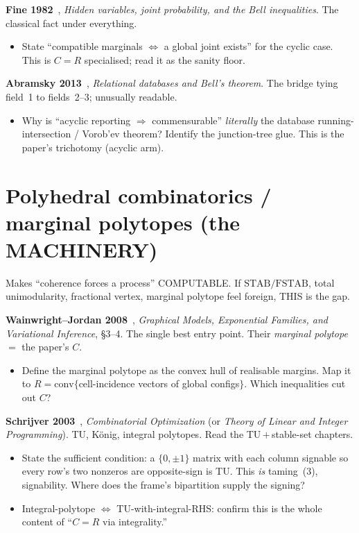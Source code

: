 \textbf{Fine 1982}~\cite{Fine1982}, \emph{Hidden variables, joint probability, and
the Bell inequalities}. The classical fact under everything.
\begin{itemize}[itemsep=1pt]
  \item State ``compatible marginals $\Leftrightarrow$ a global joint exists'' for
    the cyclic case. This is $C=R$ specialised; read it as the sanity floor.
\end{itemize}

\textbf{Abramsky 2013}~\cite{Abramsky2013}, \emph{Relational databases and Bell's
theorem}. The bridge tying field~1 to fields~2--3; unusually readable.
\begin{itemize}[itemsep=1pt]
  \item Why is ``acyclic reporting $\Rightarrow$ commensurable'' \emph{literally}
    the database running-intersection / Vorob'ev theorem? Identify the junction-tree
    glue. This is the paper's trichotomy (acyclic arm).
\end{itemize}

\section{Polyhedral combinatorics / marginal polytopes (the MACHINERY)}

Makes ``coherence forces a process'' COMPUTABLE. If $\mathrm{STAB}/\mathrm{FSTAB}$,
total unimodularity, fractional vertex, marginal polytope feel foreign, THIS is the
gap.

\textbf{Wainwright--Jordan 2008}~\cite{WainwrightJordan2008}, \emph{Graphical
Models, Exponential Families, and Variational Inference}, \S3--4. The single best
entry point. Their \emph{marginal polytope} $=$ the paper's $C$.
\begin{itemize}[itemsep=1pt]
  \item Define the marginal polytope as the convex hull of realisable margins. Map
    it to $R=\mathrm{conv}\{$cell-incidence vectors of global configs$\}$. Which
    inequalities cut out $C$?
\end{itemize}

\textbf{Schrijver 2003}~\cite{Schrijver2003}, \emph{Combinatorial Optimization} (or
\emph{Theory of Linear and Integer Programming}). TU, K\"onig, integral polytopes.
Read the TU\,$+$\,stable-set chapters.
\begin{itemize}[itemsep=1pt]
  \item State the sufficient condition: a $\{0,\pm1\}$ matrix with each column
    signable so every row's two nonzeros are opposite-sign is TU. This \emph{is}
    taming~(3), signability. Where does the frame's bipartition supply the signing?
  \item Integral-polytope $\Leftrightarrow$ TU-with-integral-RHS: confirm this is
    the whole content of ``$C=R$ via integrality.''
\end{itemize}

